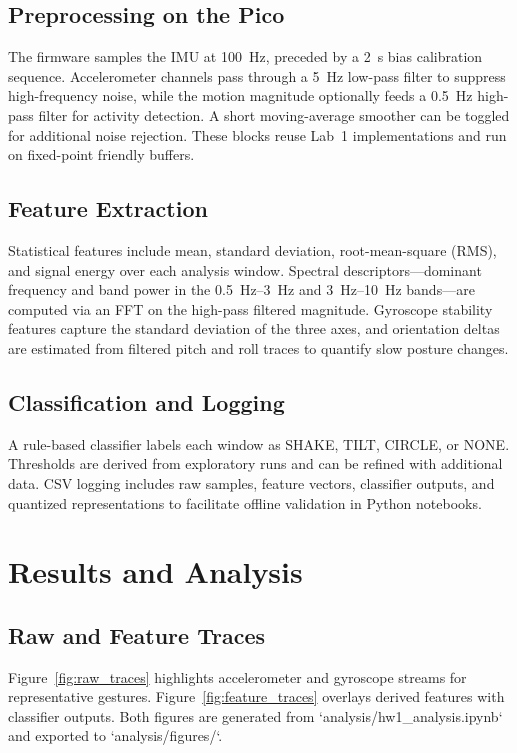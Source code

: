 \documentclass[conference]{IEEEtran}
\begin{document}
\subsection{Preprocessing on the Pico}
The firmware samples the IMU at \SI{100}{\hertz}, preceded by a \SI{2}{\second} bias calibration sequence. Accelerometer channels pass through a \SI{5}{\hertz} low-pass filter to suppress high-frequency noise, while the motion magnitude optionally feeds a \SI{0.5}{\hertz} high-pass filter for activity detection. A short moving-average smoother can be toggled for additional noise rejection. These blocks reuse Lab~1 implementations and run on fixed-point friendly buffers.

\subsection{Feature Extraction}
Statistical features include mean, standard deviation, root-mean-square (RMS), and signal energy over each analysis window. Spectral descriptors---dominant frequency and band power in the \SIrange{0.5}{3}{\hertz} and \SIrange{3}{10}{\hertz} bands---are computed via an FFT on the high-pass filtered magnitude. Gyroscope stability features capture the standard deviation of the three axes, and orientation deltas are estimated from filtered pitch and roll traces to quantify slow posture changes.

\subsection{Classification and Logging}
A rule-based classifier labels each window as \textsc{SHAKE}, \textsc{TILT}, \textsc{CIRCLE}, or \textsc{NONE}. Thresholds are derived from exploratory runs and can be refined with additional data. CSV logging includes raw samples, feature vectors, classifier outputs, and quantized representations to facilitate offline validation in Python notebooks.

\section{Results and Analysis}
\subsection{Raw and Feature Traces}
Figure~\ref{fig:raw_traces} highlights accelerometer and gyroscope streams for representative gestures. Figure~\ref{fig:feature_traces} overlays derived features with classifier outputs. Both figures are generated from `analysis/hw1_analysis.ipynb` and exported to `analysis/figures/`.
\end{document}
